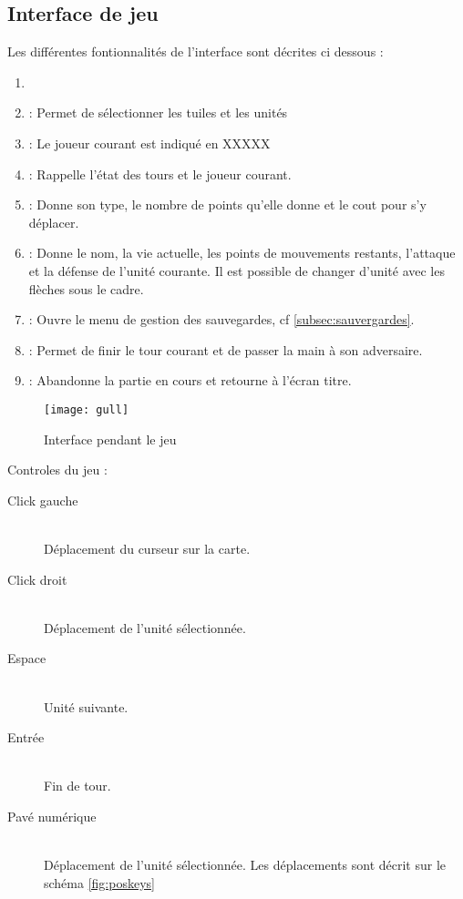 	\subsection{Interface de jeu}
		Les différentes fontionnalités de l'interface sont décrites ci dessous :
		\begin{enumerate}
			\item {} 
			\item {} : Permet de sélectionner les tuiles et les unités
			\item {} : Le joueur courant est indiqué en XXXXX
			\item {} : Rappelle l'état des tours et le joueur courant.
			\item {} : Donne son type, le nombre de points qu'elle donne et le cout pour s'y déplacer.
			\item {} : Donne le nom, la vie actuelle, les points de mouvements restants, l'attaque et la défense de l'unité courante.
						Il est possible de changer d'unité avec les flèches sous le cadre.
			\item {} : Ouvre le menu de gestion des sauvegardes, cf \ref{subsec:sauvergardes}.
			\item {} : Permet de finir le tour courant et de passer la main à son adversaire.
			\item {} : Abandonne la partie en cours et retourne à l'écran titre.
		\end{enumerate}
		
		\begin{figure}[h!]
			\caption{Interface pendant le jeu}
			\label{fig:interfaceIG}
			\centering
			\texttt{[image: gull]}
		\end{figure}
		
		Controles du jeu : 
		\begin{description}
			\item[Click gauche] \hfill \\
				Déplacement du curseur sur la carte.
			\item[Click droit] \hfill \\
				Déplacement de l'unité sélectionnée.
			\item[Espace] \hfill \\
				Unité suivante.
			\item[Entrée] \hfill \\
				Fin de tour.
			\item[Pavé numérique] \hfill \\
				Déplacement de l'unité sélectionnée. Les déplacements sont décrit sur le schéma \ref{fig:poskeys}
		\end{description}
		
